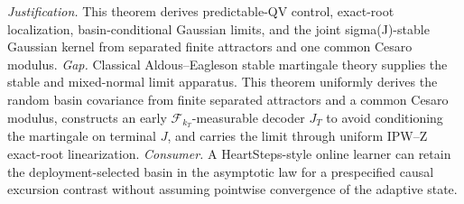 \documentclass{article}
\begin{document}
\par\smallskip\noindent \textit{Justification.} This theorem derives predictable-QV control, exact-root localization, basin-conditional Gaussian limits, and the joint sigma(J)-stable Gaussian kernel from separated finite attractors and one common Cesaro modulus. \textit{Gap.} Classical Aldous--Eagleson stable martingale theory supplies the stable and mixed-normal limit apparatus. This theorem uniformly derives the random basin covariance from finite separated attractors and a common Cesaro modulus, constructs an early \(\mathcal F_{k_T}\)-measurable decoder \(J_T\) to avoid conditioning the martingale on terminal \(J\), and carries the limit through uniform IPW--Z exact-root linearization. \textit{Consumer.} A HeartSteps-style online learner can retain the deployment-selected basin in the asymptotic law for a prespecified causal excursion contrast without assuming pointwise convergence of the adaptive state.
\end{document}
